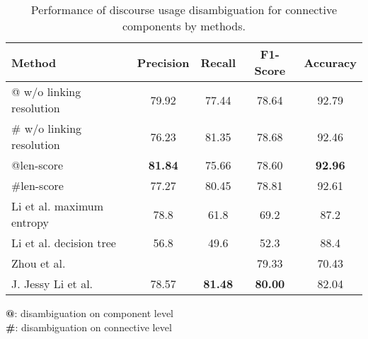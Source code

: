 \begin{table}[ht]
\centering
\begin{tabular}{|l|c|c|c|c|}
\hline

\bf Method                    & \bf Precision & \bf Recall & \bf F1-Score & \bf Accuracy \\ \hline
    @ w/o linking resolution  &     79.92     &     77.44  &     78.64    &     92.79    \\ \hline
    \# w/o linking resolution &     76.23     &     81.35  &     78.68    &     92.46    \\ \hline
    @len-score                & \bf 81.84     &     75.66  &     78.60    & \bf 92.96    \\ \hline
    \#len-score               &     77.27     &     80.45  &     78.81    &     92.61    \\

\hhline{|=|=|=|=|=|}

    Li et al. maximum entropy &     78.8      &     61.8   &     69.2     &     87.2     \\ \hline
    Li et al. decision tree   &     56.8      &     49.6   &     52.3     &     88.4     \\

\hhline{|=|=|=|=|=|}

    Zhou et al.               &               &            &     79.33    &     70.43    \\ \hline
    J. Jessy Li et al.        &     78.57     & \bf 81.48  & \bf 80.00    &     82.04    \\ \hline

\end{tabular}
\begin{flushleft}
\small
\textbf{@}: disambiguation on component level \\
\textbf{\#}: disambiguation on connective level \\
\end{flushleft}
\caption{\label{t:recognition-methods} Performance of discourse usage
disambiguation for connective components by methods. }
\end{table}
